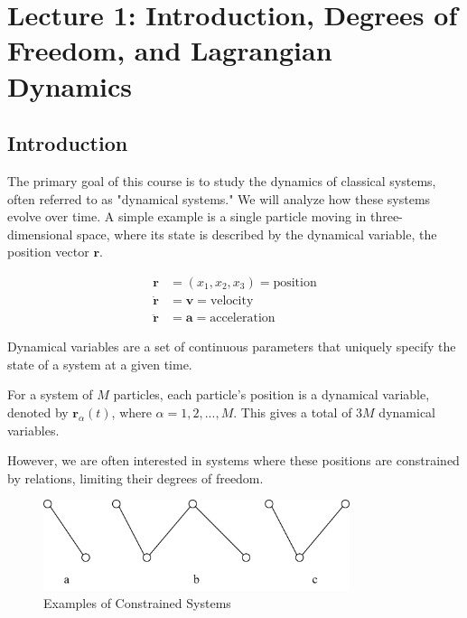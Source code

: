 \setcounter{section}{0}

\section{Lecture 1: Introduction, Degrees of Freedom, and Lagrangian Dynamics}

\subsection{Introduction}

The primary goal of this course is to study the dynamics of classical systems, often 
referred to as "dynamical systems." We will analyze how these systems evolve over time.
A simple example is a single particle moving in three-dimensional space, where its state 
is described by the dynamical variable, the position vector $\mathbf{r}$.

\begin{align*}
    \mathbf{r} &= (x_1, x_2, x_3) = \text{position} \\
    \dot{\mathbf{r}} &= \mathbf{v} = \text{velocity}\\
    \ddot{\mathbf{r}} &= \mathbf{a} = \text{acceleration}
\end{align*}

\begin{definition}
    Dynamical variables are a set of continuous parameters that uniquely specify the 
    state of a system at a given time.
\end{definition}

For a system of $M$ particles, each particle's position is a dynamical variable, denoted by $\mathbf{r}_\alpha(t)$, where $\alpha = 1, 2, ..., M$. This gives a total of $3M$ dynamical variables.

However, we are often interested in systems where these positions are constrained by relations, limiting their degrees of freedom.

\begin{figure}[ht]
    \centering
    \includegraphics[width=0.8\textwidth]{images/1-1-1.png}
    \caption{Examples of Constrained Systems}
    \label{fig:1-1-1}
\end{figure}

